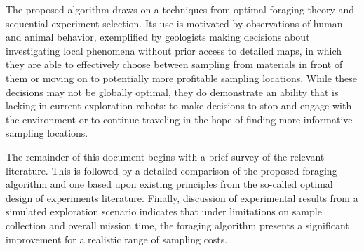 The proposed algorithm draws on a techniques from optimal foraging theory and sequential experiment selection.  Its use is motivated by observations of human and animal behavior, exemplified by geologists making decisions about investigating local phenomena without prior access to detailed maps, in which they are able to effectively choose between sampling from materials in front of them or moving on to potentially more profitable sampling locations.  While these decisions may not be globally optimal, they do demonstrate an ability that is lacking in current exploration robots: to make decisions to stop and engage with the environment or to continue traveling in the hope of finding more informative sampling locations.

The remainder of this document begins with a brief survey of the relevant literature.  This is followed by a detailed comparison of the proposed foraging algorithm and one based upon existing principles from the so-called optimal design of experiments literature.  Finally, discussion of experimental results from a simulated exploration scenario indicates that under limitations on sample collection and overall mission time, the foraging algorithm presents a significant improvement for a realistic range of sampling costs.


	
	


